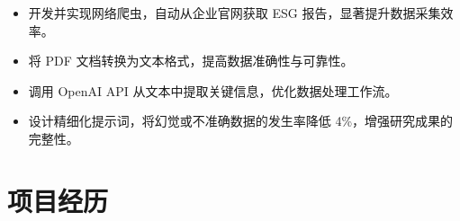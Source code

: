 \documentclass{resume}
\begin{document}
\begin{itemize}
  \item 开发并实现网络爬虫，自动从企业官网获取 ESG 报告，显著提升数据采集效率。
  \item 将 PDF 文档转换为文本格式，提高数据准确性与可靠性。
  \item 调用 OpenAI API 从文本中提取关键信息，优化数据处理工作流。
  \item 设计精细化提示词，将幻觉或不准确数据的发生率降低 4\%，增强研究成果的完整性。
\end{itemize}

\section{项目经历}
\end{document}
